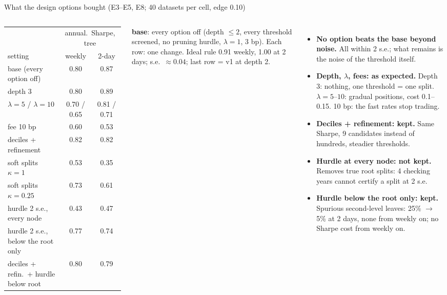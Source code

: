\documentclass[10pt,aspectratio=169]{beamer}
\newcommand{\1}{\mathbf{1}}
\begin{document}
\begin{frame}{What the design options bought (E3--E5, E8; 40 datasets per cell, edge 0.10)}
\begin{columns}[T]
\scriptsize\setlength{\tabcolsep}{2pt}
\begin{tabular}{@{}l cc@{}}
\toprule
& \multicolumn{2}{c}{annual.\ Sharpe, tree}\\
\cmidrule(lr){2-3}
setting & weekly & 2-day\\
\midrule
base (every option off) & 0.80 & 0.87\\
depth 3 & 0.80 & 0.89\\
$\lambda=5$ / $\lambda=10$ & 0.70 / 0.65 & 0.81 / 0.71\\
fee 10 bp & 0.60 & 0.53\\
deciles + refinement & 0.82 & 0.82\\
soft splits $\kappa=1$ & 0.53 & 0.35\\
soft splits $\kappa=0.25$ & 0.73 & 0.61\\
hurdle 2 s.e., every node & 0.43 & 0.47\\
hurdle 2 s.e., below the root only & 0.77 & 0.74\\
deciles + refin.\ + hurdle below root & 0.80 & 0.79\\
\bottomrule
\end{tabular}

\smallskip
\textbf{base}: every option off (depth $\le2$, every threshold screened, no pruning hurdle, $\lambda=1$, 3 bp). Each row: one change. Ideal rule 0.91 weekly, 1.00 at 2 days; s.e.\ $\approx0.04$; last row = v1 at depth 2.
\footnotesize
\begin{itemize}
\item \textbf{No option beats the base beyond noise.} All within 2 s.e.; what remains is the noise of the threshold itself.
\item \textbf{Depth, $\lambda$, fees: as expected.} Depth 3: nothing, one threshold = one split. $\lambda=5$--$10$: gradual positions, cost 0.1--0.15. 10 bp: the fast rates stop trading.
\item \textbf{Deciles + refinement: kept.} Same Sharpe, 9 candidates instead of hundreds, steadier thresholds.
\item \textbf{Hurdle at every node: not kept.} Removes true root splits: 4 checking years cannot certify a split at 2 s.e.
\item \textbf{Hurdle below the root only: kept.} Spurious second-level leaves: 25\% $\to$ 5\% at 2 days, none from weekly on; no Sharpe cost from weekly on.
\end{itemize}
\end{columns}
\end{frame}
\end{document}
